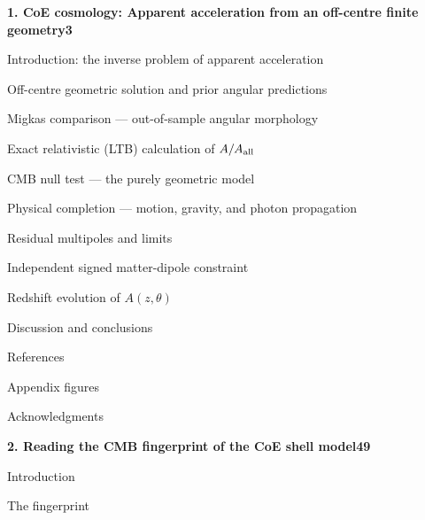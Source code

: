 \documentclass[11pt,a4paper]{article}
\begin{document}
{\small
\noindent\textbf{1. CoE cosmology: Apparent acceleration from an off-centre finite geometry}\dotfill\textbf{3}\par\smallskip
\noindent\hspace*{1.2em}Introduction: the inverse problem of apparent acceleration\par
\noindent\hspace*{1.2em}Off-centre geometric solution and prior angular predictions\par
\noindent\hspace*{1.2em}Migkas comparison — out-of-sample angular morphology\par
\noindent\hspace*{1.2em}Exact relativistic (LTB) calculation of $A/A_{\rm all}$\par
\noindent\hspace*{1.2em}CMB null test — the purely geometric model\par
\noindent\hspace*{1.2em}Physical completion — motion, gravity, and photon propagation\par
\noindent\hspace*{1.2em}Residual multipoles and limits\par
\noindent\hspace*{1.2em}Independent signed matter-dipole constraint\par
\noindent\hspace*{1.2em}Redshift evolution of $A(z,\theta)$\par
\noindent\hspace*{1.2em}Discussion and conclusions\par
\noindent\hspace*{1.2em}References\par
\noindent\hspace*{1.2em}Appendix figures\par
\noindent\hspace*{1.2em}Acknowledgments\par
\noindent\textbf{2. Reading the CMB fingerprint of the CoE shell model}\dotfill\textbf{49}\par\smallskip
\noindent\hspace*{1.2em}Introduction\par
\noindent\hspace*{1.2em}The fingerprint\par
}
\end{document}
